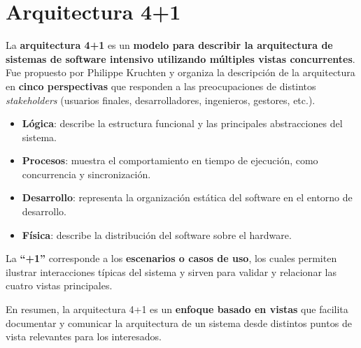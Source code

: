\chapter{Arquitectura 4+1}

\begin{flushleft}
	La \textbf{arquitectura 4+1} es un \textbf{modelo para describir la arquitectura de sistemas de software intensivo utilizando múltiples vistas concurrentes}. Fue propuesto por Philippe Kruchten y organiza la descripción de la arquitectura en \textbf{cinco perspectivas} que responden a las preocupaciones de distintos \textit{stakeholders} (usuarios finales, desarrolladores, ingenieros, gestores, etc.).

\begin{itemize}
	\item \textbf{Lógica}: describe la estructura funcional y las principales abstracciones del sistema.
	\item \textbf{Procesos}: muestra el comportamiento en tiempo de ejecución, como concurrencia y sincronización.
	\item \textbf{Desarrollo}: representa la organización estática del software en el entorno de desarrollo.
	\item \textbf{Física}: describe la distribución del software sobre el hardware.
\end{itemize}

La \textbf{``+1''} corresponde a los \textbf{escenarios o casos de uso}, los cuales permiten ilustrar interacciones típicas del sistema y sirven para validar y relacionar las cuatro vistas principales.

En resumen, la arquitectura 4+1 es un \textbf{enfoque basado en vistas} que facilita documentar y comunicar la arquitectura de un sistema desde distintos puntos de vista relevantes para los interesados.
\end{flushleft}


	
	
	
	
	
	
